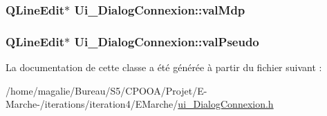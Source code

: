 \hypertarget{class_ui___dialog_connexion_ae59151879eebdd101eaae39a532cdff8}{
\subsubsection[{val\-Mdp}]{\setlength{\rightskip}{0pt plus 5cm}Q\-Line\-Edit$\ast$ Ui\-\_\-\-Dialog\-Connexion\-::val\-Mdp}}\label{class_ui___dialog_connexion_ae59151879eebdd101eaae39a532cdff8}
\hypertarget{class_ui___dialog_connexion_a4560ad500c66e02c38d52f01b71c5c8b}{
\subsubsection[{val\-Pseudo}]{\setlength{\rightskip}{0pt plus 5cm}Q\-Line\-Edit$\ast$ Ui\-\_\-\-Dialog\-Connexion\-::val\-Pseudo}}\label{class_ui___dialog_connexion_a4560ad500c66e02c38d52f01b71c5c8b}


La documentation de cette classe a été générée à partir du fichier suivant \-:\begin{DoxyCompactItemize}
\item 
/home/magalie/\-Bureau/\-S5/\-C\-P\-O\-O\-A/\-Projet/\-E-\/\-Marche-\//iterations/iteration4/\-E\-Marche/\hyperlink{ui___dialog_connexion_8h}{ui\-\_\-\-Dialog\-Connexion.\-h}\end{DoxyCompactItemize}
